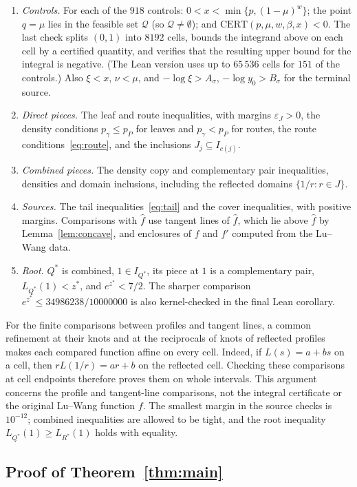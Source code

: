 \documentclass[11pt]{article}
\theoremstyle{definition}
\theoremstyle{remark}
\newcommand{\fh}{\widehat f}
\newcommand{\cert}{\mathrm{CERT}}
\newcommand{\feas}{\mathcal Q}
\begin{document}
\begin{enumerate}[label=(C\arabic*),leftmargin=*]
\item \emph{Controls.} For each of the $918$ controls: $0<x<\min\{p,(1-\mu)^w\}$; the point $q=\mu$ lies in the
feasible set $\feas$ (so $\feas\ne\emptyset$); and $\cert(p,\mu,w,\beta,x)<0$. The last check splits $(0,1)$ into
$8192$ cells, bounds the integrand above on each cell by a certified quantity, and verifies that the resulting upper bound
for the integral is negative. (The Lean version uses up to $65\,536$ cells for $151$ of the controls.) Also $\xi<x$, $\nu<\mu$, and
$-\log\xi>A_\sigma$, $-\log y_0>B_\sigma$ for the terminal source.
\item \emph{Direct pieces.} The leaf and route inequalities, with margins $\varepsilon_J>0$, the density conditions
$p_\gamma\le p_P$ for leaves and $p_\gamma<p_P$ for routes, the route conditions~\eqref{eq:route}, and the inclusions
$J_j\subseteq I_{c(j)}$.
\item \emph{Combined pieces.} The density copy and complementary pair inequalities, densities and domain inclusions,
including the reflected domains $\{1/r:r\in J\}$.
\item \emph{Sources.} The tail inequalities~\eqref{eq:tail} and the cover inequalities, with positive margins. Comparisons
with $\fh$ use tangent lines of $\fh$, which lie above $\fh$ by Lemma~\ref{lem:concave}, and enclosures of $f$ and $f'$
computed from the Lu--Wang data.
\item \emph{Root.} $Q^*$ is combined, $1\in I_{Q^*}$, its piece at $1$ is a complementary pair, $L_{Q^*}(1)<z^*$, and
$e^{z^*}<7/2$. The sharper comparison $e^{z^*}\le34986238/10000000$ is also kernel-checked
in the final Lean corollary.
\end{enumerate}

For the finite comparisons between profiles and tangent lines, a common refinement at their knots and at
the reciprocals of knots of reflected profiles makes each compared function affine on every cell.
Indeed, if $L(s)=a+bs$ on a cell, then $rL(1/r)=ar+b$ on the reflected cell.
Checking these comparisons at cell endpoints therefore proves them on whole intervals.
This argument concerns the profile and tangent-line comparisons, not the integral certificate or the original
Lu--Wang function $f$. The smallest margin in the source checks is $10^{-12}$;
combined inequalities are allowed to be tight, and the root inequality
$L_{Q^*}(1)\ge L_{R^*}(1)$ holds with equality.

\subsection{Proof of Theorem~\ref{thm:main}}
\end{document}
